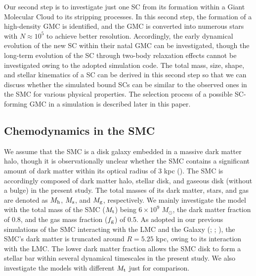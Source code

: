 \documentclass[fleqn,usenatbib]{mnras}
\begin{document}
Our second step is to investigate just one SC from its formation within a Giant Molecular Cloud to its stripping processes. 
In this second step, the formation of 
a high-density GMC is identified, and the GMC is converted into numerous stars with $N\approx 10^5$ to achieve better resolution. 
Accordingly, the early dynamical evolution of the new SC within their natal GMC can be investigated, though the long-term evolution of the SC through two-body relaxation
effects cannot be investigated owing to the adopted simulation code. The total mass, size, shape, and stellar kinematics of a SC can be derived in this second step so that we can discuss whether the simulated bound SCs can be similar to the observed ones in the SMC for various physical properties.
The selection process of a possible SC-forming GMC in a simulation is described later in this paper.

\subsection{Chemodynamics in the SMC}

We assume that the SMC is a disk galaxy embedded in a massive dark matter halo, though it is observationally unclear whether the SMC contains a significant amount of dark matter within its optical radius of 3 kpc (\citealt{K1_Bekki_Stanimirovic2009}). The SMC is accordingly composed of dark matter halo, stellar disk, and gaseous disk (without a bulge) in the present study.
The total masses of its dark matter, stars, and gas
are denoted as $M_{\rm h}$, $M_{\rm s}$, and $M_{\rm g}$, respectively. We mainly investigate the model with 
the total mass of the SMC ($M_{\rm t}$) being $6 \times 10^9$ $M_{\odot}$, the dark matter fraction of 0.8, and the gas mass fraction ($f_{\rm g}$) of 0.5. As adopted in our previous simulations of the SMC interacting with the LMC
and the Galaxy (\citealt{29Bekki_Chiba2007}; \citealt{K2_Bekki_Chiba2008}; \citealt{K3_Diaz_Bekki2012}),
the SMC's dark matter is truncated around $R=5.25$ kpc, owing to its interaction with the LMC. The lower dark matter fraction allows the SMC disk to form a stellar bar
within several dynamical timescales in the present study.
We also investigate the models with different $M_{\rm t}$ just for comparison.
\end{document}
